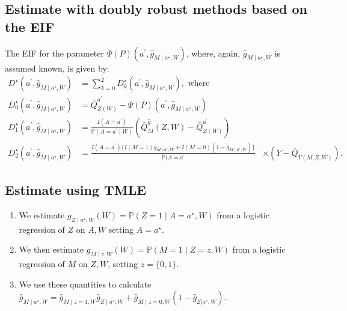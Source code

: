 \documentclass[
  12pt, krantz2,
]{book}
\providecommand{\tightlist}{%
  \setlength{\itemsep}{0pt}\setlength{\parskip}{0pt}}
\theoremstyle{definition}
\theoremstyle{definition}
\theoremstyle{definition}
\renewcommand{\P}{\mathbb{P}}
\newcommand{\1}{\mathbbm{1}}
\begin{document}
\hypertarget{estimate-with-doubly-robust-methods-based-on-the-eif}{%
\subsection{Estimate with doubly robust methods based on the EIF}\label{estimate-with-doubly-robust-methods-based-on-the-eif}}

The EIF for the parameter \(\Psi(P)(a^{\prime}, \hat{g}_{M \mid a^{\star},W})\),
where, again, \(\hat{g}_{M \mid a^{\star}, W}\) is assumed known, is given by:
\begin{align*}
  D^{\star}(a^{\prime}, \hat{g}_{M \mid a^{\star}, W}) &= \sum_{k=0}^2
      D_k^{\star}(a^{\prime}, \hat{g}_{M \mid a^{\star}, W}), \text{ where }\\
  D^{\star}_0(a^{\prime}, \hat{g}_{M \mid a^{\star}, W}) &=
      \bar{Q}^{a^{\prime}}_{Z(W)} -
      \Psi(P)(a^{\prime}, \hat{g}_{M \mid a^{\star}, W})\\
  D^{\star}_1(a^{\prime}, \hat{g}_{M \mid a^{\star}, W}) &=
      \frac{I(A=a^{\prime})}{\P(A=a^{\prime} \mid W)}(\bar{Q}^{\hat{g}}_M(Z,W)
      - \bar{Q}^{a^{\prime}}_{Z(W)})\\
  D^{\star}_2(a^{\prime}, \hat{g}_{M \mid a^{\star}, W}) &=
      \frac{I(A=a^{\prime})\{I(M=1) \hat{g}_{M \mid a^{\star}, W} +
      I(M=0)(1-\hat{g}_{M \mid a^{\star}, W}) \}}{\P(A=a^{\prime}}
      &\times (Y-\bar{Q}_{Y(M,Z,W)}).
\end{align*}

\hypertarget{estimate-using-tmle}{%
\subsection{Estimate using TMLE}\label{estimate-using-tmle}}

\begin{enumerate}
\def\labelenumi{\arabic{enumi}.}
\tightlist
\item
  We estimate \(g_{Z \mid a^{\star}, W}(W) = \P(Z=1 \mid A=a^{\star}, W)\) from
  a logistic regression of \(Z\) on \(A, W\) setting \(A=a^{\star}\).
\item
  We then estimate \(g_{M \mid z,W}(W) = \P(M=1 \mid Z=z, W)\) from a logistic
  regression of \(M\) on \(Z, W\), setting \(z=\{0,1\}\).
\item
  We use these quantities to calculate \(\hat{g}_{M \mid a^{\star}, W} = \hat{g}_{M \mid z=1,W}\hat{g}_{Z \mid a^{\star}, W} + \hat{g}_{M \mid z=0,W}(1-\hat{g}_{Z|a^{\star}, W})\).
\end{enumerate}
\end{document}
